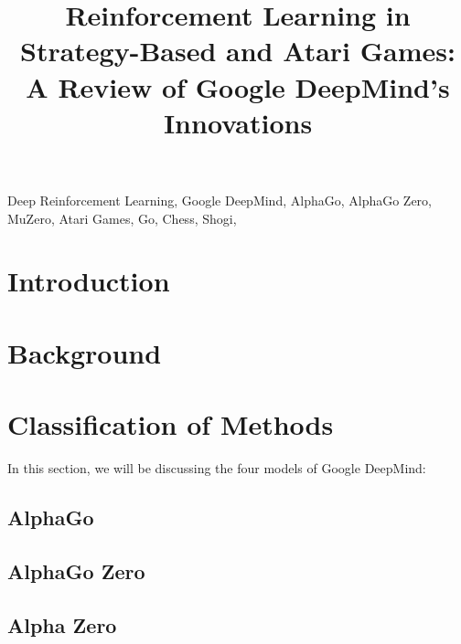\documentclass[conference]{IEEEtran}
\begin{document}
\title{Reinforcement Learning in Strategy-Based and Atari Games: A Review of Google DeepMind's Innovations\\}



\maketitle
\thispagestyle{plain}
\pagestyle{plain}
\begin{abstract}

    

\end{abstract}

\begin{IEEEkeywords}
    Deep Reinforcement Learning, Google DeepMind, AlphaGo, AlphaGo Zero, MuZero, Atari Games, Go, Chess, Shogi,
\end{IEEEkeywords}

\section{Introduction}



\section{Background}


\section{Classification of Methods}
In this section, we will be discussing the four models of Google DeepMind:
\subsection{AlphaGo}


\subsection{AlphaGo Zero}


\subsection{Alpha Zero}

\end{document}
